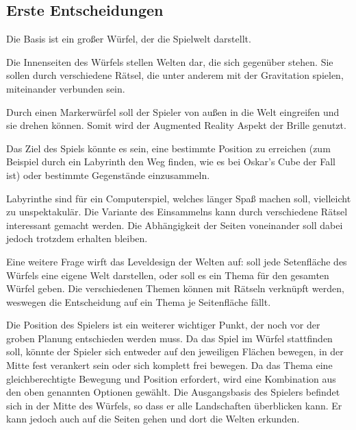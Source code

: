 \subsection{Erste Entscheidungen}
Die Basis ist ein großer Würfel, der die Spielwelt darstellt. 

Die Innenseiten des Würfels stellen Welten dar, die sich gegenüber stehen. Sie sollen durch verschiedene Rätsel, die unter anderem mit der Gravitation spielen, miteinander verbunden sein. 

Durch einen Markerwürfel soll der Spieler von außen in die Welt eingreifen und sie drehen können. Somit wird der Augmented Reality Aspekt der Brille genutzt. 

Das Ziel des Spiels könnte es sein, eine bestimmte Position zu erreichen (zum Beispiel durch ein Labyrinth den Weg finden, wie es bei Oskar's Cube der Fall ist) oder bestimmte Gegenstände einzusammeln.
   
Labyrinthe sind für ein Computerspiel, welches länger Spaß machen soll, vielleicht zu unspektakulär. Die Variante des Einsammelns kann durch verschiedene Rätsel interessant gemacht werden. Die Abhängigkeit der Seiten voneinander soll dabei jedoch trotzdem erhalten bleiben.

Eine weitere Frage wirft das Leveldesign der Welten auf: soll jede Setenfläche des Würfels eine eigene Welt darstellen, oder soll es ein Thema für den gesamten Würfel geben. Die verschiedenen Themen können mit Rätseln verknüpft werden, weswegen die Entscheidung auf ein Thema je Seitenfläche fällt.

Die Position des Spielers ist ein weiterer wichtiger Punkt, der noch vor der groben Planung entschieden werden muss. Da das Spiel im Würfel stattfinden soll, könnte der Spieler sich entweder auf den jeweiligen Flächen bewegen, in der Mitte fest verankert sein oder sich komplett frei bewegen. Da das Thema eine gleichberechtigte Bewegung und Position erfordert, wird eine Kombination aus den oben genannten Optionen gewählt. Die Ausgangsbasis des Spielers befindet sich in der Mitte des Würfels, so dass er alle Landschaften überblicken kann. Er kann jedoch auch auf die Seiten gehen und dort die Welten erkunden.